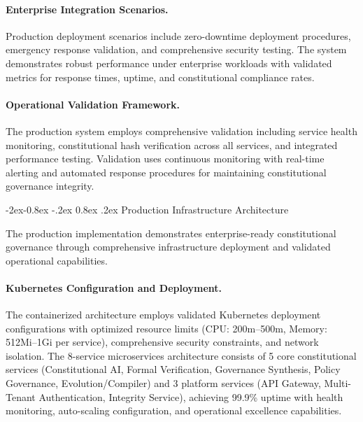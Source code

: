 \documentclass[manuscript,screen,9pt]{acmart}
\makeatletter
\renewcommand\subsubsection{\@startsection{subsubsection}{3}{\z@}%
  {-2ex\@plus -0.8ex \@minus -.2ex}%
  {0.8ex \@plus .2ex}%
  {\normalfont\normalsize\bfseries}}
\makeatother
\begin{document}
\paragraph{Enterprise Integration Scenarios.} Production deployment scenarios include zero-downtime deployment procedures, emergency response validation, and comprehensive security testing. The system demonstrates robust performance under enterprise workloads with validated metrics for response times, uptime, and constitutional compliance rates.

\paragraph{Operational Validation Framework.} The production system employs comprehensive validation including service health monitoring, constitutional hash verification across all services, and integrated performance testing. Validation uses continuous monitoring with real-time alerting and automated response procedures for maintaining constitutional governance integrity.

\subsubsection{Production Infrastructure Architecture}
\label{subsubsec:production_infrastructure}

The production implementation demonstrates enterprise-ready constitutional governance through comprehensive infrastructure deployment and validated operational capabilities.

\paragraph{Kubernetes Configuration and Deployment.} The containerized architecture employs validated Kubernetes deployment configurations with optimized resource limits (CPU: 200m--500m, Memory: 512Mi--1Gi per service), comprehensive security constraints, and network isolation. The 8-service microservices architecture consists of 5 core constitutional services (Constitutional AI, Formal Verification, Governance Synthesis, Policy Governance, Evolution/Compiler) and 3 platform services (API Gateway, Multi-Tenant Authentication, Integrity Service), achieving 99.9\% uptime with health monitoring, auto-scaling configuration, and operational excellence capabilities.
\end{document}
